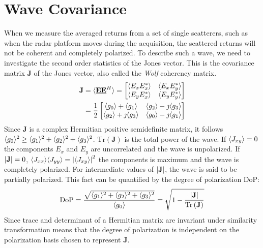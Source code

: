 \documentclass[11pt]{article}
\begin{document}
\section{Wave Covariance}
When we measure the averaged returns from a set of single scatterers, such as when the radar platform moves during the acquisition, the scattered returns will not be coherent and completely polarized. To describe such a wave, we need to investigate the second order statistics of the Jones vector. This is the covariance matrix $\mathbf{J}$ of the Jones vector, also called the \emph{Wolf} coherency matrix.
\begin{equation}
	\begin{split}
		\mathbf{J} &= 
		\langle\mathbf{\underline{E}} \mathbf{\underline{E}}^{H}\rangle =
		\begin{bmatrix}
			\langle E_{x}E_{x}^{*}\rangle & \langle E_{x}E_{y}^{*}\rangle \\
			\langle E_{y}E_{x}^{*}\rangle & \langle E_{y}E_{y}^{*}\rangle \\
		\end{bmatrix} \\
		&=
		\frac{1}{2}
		\begin{bmatrix}
			\langle g_{0}\rangle + \langle g_{1}\rangle & \langle g_{2}\rangle - \jmath\langle g_{3}\rangle\\
			\langle g_{2}\rangle + \jmath\langle g_{3}\rangle & \langle g_{0}\rangle - \jmath\langle g_{1}\rangle
		\end{bmatrix}
	\end{split}
\end{equation}
Since $\mathbf{J}$ is a complex Hermitian positive semidefinite matrix, it follows 
$\langle g_{0}\rangle^{2} \geq \langle g_{1}\rangle^{2} + \langle g_{2}\rangle^{2} + \langle g_{3}\rangle^{2}$. $\mathrm{Tr}\left(\mathbf{J}\right)$ is the total power of the wave. If $\langle J_{xy}\rangle = 0$ the components $E_{x}$ and $E_{y}$ are uncorrelated and the wave is unpolarized. If $\left|\mathbf{J}\right| = 0$, $\langle J_{xx}\rangle\langle J_{yy}\rangle = \left|\langle J_{xy}\rangle\right|^2$ the components is maximum and the wave is completely polarized.
For intermediate values of $\left|\mathbf{J}\right|$, the wave is said to be partially polarized. This fact can be quantified by the degree of polarization DoP:
\begin{equation}
	\mathrm{DoP} = \frac{\sqrt{\langle g_{1}\rangle^2+\langle g_{2}\rangle^2+\langle g_{3}\rangle^2}}{\langle g_{0}\rangle} 
	= \sqrt{1 - \frac{\left|\mathbf{J}\right|}{\mathrm{Tr}\left(\mathbf{J}\right)}}
\end{equation}
Since trace and determinant of a Hermitian matrix are invariant under similarity transformation means that the degree of polarization is independent on the polarization basis chosen to represent $\mathbf{J}$.
\end{document}
